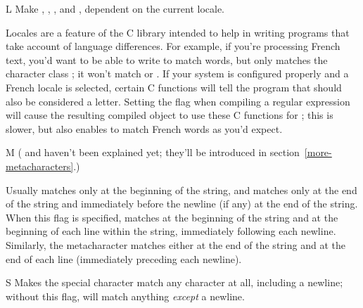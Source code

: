 \documentclass{howto}
\begin{document}
\begin{datadesc}{L}
Make , , ,
and , dependent on the current locale.  

Locales are a feature of the C library intended to help in writing
programs that take account of language differences.  For example, if
you're processing French text, you'd want to be able to write
 to match words, but  only matches the
character class \regexp{[A-Za-z]}; it won't match  or
.  If your system is configured properly and a French
locale is selected, certain C functions will tell the program that
 should also be considered a letter.  Setting the
 flag when compiling a regular expression will cause the
resulting compiled object to use these C functions for ;
this is slower, but also enables  to match French words as
you'd expect.
\end{datadesc}

\begin{datadesc}{M}
(\regexp{\^} and \regexp{\$} haven't been explained yet; 
they'll be introduced in section~\ref{more-metacharacters}.)

Usually \regexp{\^} matches only at the beginning of the string, and
\regexp{\$} matches only at the end of the string and immediately before the
newline (if any) at the end of the string. When this flag is
specified, \regexp{\^} matches at the beginning of the string and at
the beginning of each line within the string, immediately following
each newline.  Similarly, the \regexp{\$} metacharacter matches either at
the end of the string and at the end of each line (immediately
preceding each newline).

\end{datadesc}

\begin{datadesc}{S}
Makes the  special character match any character at all,
including a newline; without this flag,  will match
anything \emph{except} a newline.
\end{datadesc}
\end{document}
